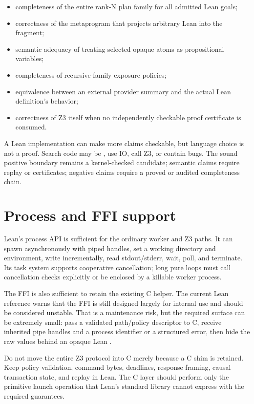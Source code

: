 \documentclass[10pt,letterpaper,oneside]{report}
\newcommand{\code}[1]{\texttt{\detokenize{#1}}}
\begin{document}
\begin{itemize}
  \item completeness of the entire rank-N plan family for all admitted Lean goals;
  \item correctness of the metaprogram that projects arbitrary Lean \code{Expr} into the fragment;
  \item semantic adequacy of treating selected opaque atoms as propositional variables;
  \item completeness of recursive-family exposure policies;
  \item equivalence between an external provider summary and the actual Lean definition's behavior;
  \item correctness of Z3 itself when no independently checkable proof certificate is consumed.
\end{itemize}

\begin{trustbox}
A Lean implementation can make more claims checkable, but language choice is not a proof. Search code may be \code{partial}, use IO, call Z3, or contain bugs. The sound positive boundary remains a kernel-checked candidate; semantic claims require replay or certificates; negative claims require a proved or audited completeness chain.
\end{trustbox}

\section{Process and FFI support}

Lean's process API is sufficient for the ordinary worker and Z3 paths. It can spawn asynchronously with piped handles, set a working directory and environment, write incrementally, read stdout/stderr, wait, poll, and terminate. Its task system supports cooperative cancellation; long pure loops must call cancellation checks explicitly or be enclosed by a killable worker process.

The FFI is also sufficient to retain the existing C helper. The current Lean reference warns that the FFI is still designed largely for internal use and should be considered unstable. That is a maintenance risk, but the required surface can be extremely small: pass a validated path/policy descriptor to C, receive inherited pipe handles and a process identifier or a structured error, then hide the raw values behind an opaque Lean \code{Z3ProcessCapability}.

\begin{riskbox}
Do not move the entire Z3 protocol into C merely because a C shim is retained. Keep policy validation, command bytes, deadlines, response framing, causal transaction state, and replay in Lean. The C layer should perform only the primitive launch operation that Lean's standard library cannot express with the required guarantees.
\end{riskbox}
\end{document}
